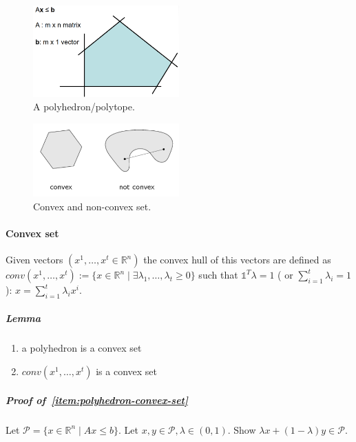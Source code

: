 \documentclass[main]{subfiles}
\begin{document}
\begin{figure}
  \label{fig:polyhedron}
  \caption{A polyhedron/polytope.}
  \centering
    \includegraphics[width=0.5\textwidth]{imgs/polyhedron.png}
\end{figure}

\begin{figure}
  \label{fig:convex-set}
  \caption{Convex and non-convex set.}
  \centering
    \includegraphics[width=0.5\textwidth]{imgs/convex-set.png}
\end{figure}


\paragraph{Convex set}
Given vectors $(x^{1}, \dots, x^{t} \in \mathbb{R}^{n})$ the convex hull of
this vectors are defined as $conv(x^{1}, \dots, x^{t}):= \{ x \in
\mathbb{R}^{n} \mid \exists \lambda_{1}, \dots, \lambda_{t} \geq 0 \}$ such
that $\mathds{1}^{T} \lambda = 1$ ( or $\sum_{i=1}^{t} \lambda_{i} = 1$):
$x = \sum_{i=1}^{t} \lambda_{i} x^{i}$.

\subparagraph{Lemma}
\begin{enumerate}
\item \label{item:polyhedron-convex-set} a polyhedron is a convex set
\item \label{item:convex-hull-convex-set} $conv(x^{1}, \dots, x^{t})$ is a convex set
\end{enumerate}

\subparagraph{Proof of~\ref{item:polyhedron-convex-set}}
Let $\mathcal{P} = \{ x \in \mathbb{R}^{n} \mid Ax \leq b\}$. Let $x,y \in
\mathcal{P}, \lambda \in (0,1)$. Show $\lambda x + (1 - \lambda) y \in
\mathcal{P}$.
\end{document}

